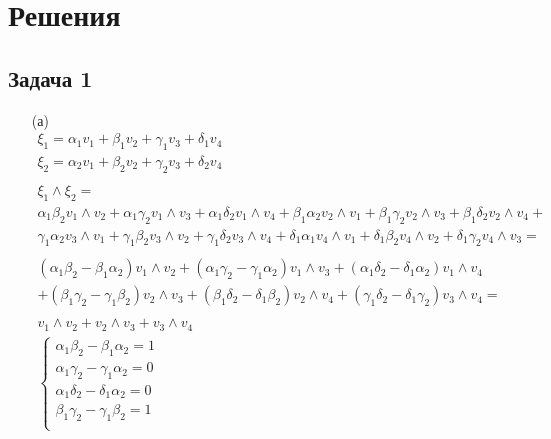 
\newpage
\section*{Решения}
\subsection*{Задача 1}
\begin{enumerate}
\item[(а)]
	\begin{gather*}
		\xi_1 = \alpha_1 v_1 + \beta_1 v_2 + \gamma_1 v_3 + \delta_1 v_4\\
		\xi_2 = \alpha_2 v_1 + \beta_2 v_2 + \gamma_2 v_3 + \delta_2 v_4\\
		\\
		\xi_1 \wedge \xi_2 = \\
		\alpha_1 \beta_2 v_1 \wedge v_2 + \alpha_1 \gamma_2 v_1 \wedge v_3 + \alpha_1 \delta_2 v_1 \wedge v_4 + \beta_1 \alpha_2 v_2 \wedge v_1 + \beta_1 \gamma_2 v_2 \wedge v_3 + \beta_1 \delta_2 v_2 \wedge v_4 +\\
		 \gamma_1 \alpha_2 v_3 \wedge v_1 + \gamma_1 \beta_2 v_3 \wedge v_2 + \gamma_1 \delta_2 v_3 \wedge v_4 + \delta_1 \alpha_1 v_4 \wedge v_1 + \delta_1 \beta_2 v_4 \wedge v_2 + \delta_1 \gamma_2 v_4 \wedge v_3 =\\
		\\
		(\alpha_1 \beta_2 - \beta_1 \alpha_2) v_1 \wedge v_2 + (\alpha_1 \gamma_2 - \gamma_1 \alpha_2) v_1 \wedge v_3 + (\alpha_1 \delta_2 - \delta_1 \alpha_2)v_1 \wedge v_4\\
		+ (\beta_1 \gamma_2 - \gamma_1 \beta_2) v_2 \wedge v_3 + (\beta_1 \delta_2 - \delta_1 \beta_2) v_2 \wedge v_4 + (\gamma_1 \delta_2 - \delta_1 \gamma_2) v_3 \wedge v_4 =\\
		\\
		v_1 \wedge v_2 + v_2 \wedge v_3 + v_3 \wedge v_4\\
		\begin{cases}
			\alpha_1 \beta_2 - \beta_1 \alpha_2 = 1\\
			\alpha_1 \gamma_2 - \gamma_1 \alpha_2 = 0\\
			\alpha_1 \delta_2 - \delta_1 \alpha_2 = 0\\
			\beta_1 \gamma_2 - \gamma_1 \beta_2 = 1\\

\end{cases}
\end{gather*}
\end{enumerate}
